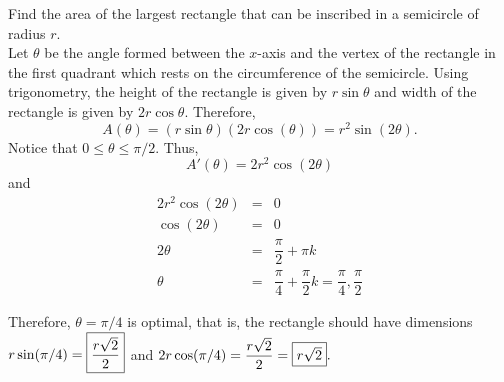 \documentclass{book}
\begin{document}
\begin{Exam} Find the area of the largest rectangle that can be inscribed in a semicircle of radius $r$.\\

Let $\theta$ be the angle formed between the $x$-axis and the vertex of the rectangle in the first quadrant which rests on the circumference of the semicircle. Using trigonometry, the height of the rectangle is given by $r\sin \theta$ and width of the rectangle is given by $2r\cos\theta$. Therefore,
\[A(\theta) = (r\sin\theta)(2r\cos(\theta)) = r^2\sin(2\theta).\] Notice that $0 \le \theta \le \pi/2$. Thus, 
\[A'(\theta) = 2r^2\cos(2\theta)\] and 
\begin{eqnarray*}
2r^2\cos(2\theta) &=& 0\\
\cos(2\theta) &=& 0\\
2\theta &=& \dfrac{\pi}{2} + \pi k\\
\theta &=& \dfrac{\pi}{4} + \dfrac{\pi}{2} k = \dfrac{\pi}{4}, \dfrac{\pi}{2}
\end{eqnarray*}
\begin{center}
\end{center}
Therefore, $\theta = \pi/4$ is optimal, that is, the rectangle should have dimensions $r\sin(\pi/4) = \fbox{$\dfrac{r\sqrt{2}}{2}$}$ and $2r\cos(\pi/4) = \dfrac{r\sqrt{2}}{2} = \fbox{$r\sqrt{2}$}.$
\end{Exam}


\vfill
{}
\pagebreak
\end{document}
